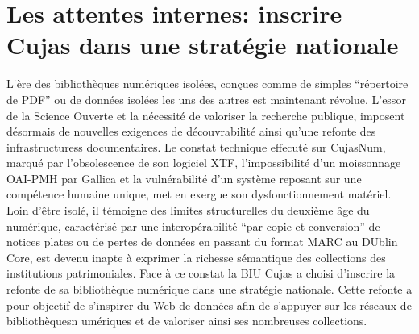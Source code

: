 \chapter[Les attentes internes]{Les attentes internes: inscrire Cujas dans une stratégie nationale}

\lettrine{L}'ère des bibliothèques numériques isolées, conçues comme de simples \enquote{répertoire de PDF} ou de données isolées les uns des autres est maintenant révolue. L'essor de la Science Ouverte et la nécessité de valoriser la recherche publique, imposent désormais de nouvelles exigences de découvrabilité ainsi qu'une refonte des infrastructuress documentaires. Le constat technique effecuté sur CujasNum, marqué par l'obsolescence de son logiciel XTF, l'impossibilité d'un moissonnage OAI-PMH par Gallica et la vulnérabilité d'un système reposant sur une compétence humaine unique, met en exergue son dysfonctionnement matériel. Loin d'être isolé, il témoigne des limites structurelles du deuxième âge du numérique, caractérisé par une interopérabilité \enquote{par copie et conversion} de notices plates ou de pertes de données en passant du format MARC au DUblin Core, est devenu inapte à exprimer la richesse sémantique des collections des institutions patrimoniales. Face à ce constat la BIU Cujas a choisi d'inscrire la refonte de sa bibliothèque numérique dans une stratégie nationale. Cette refonte a pour objectif de s'inspirer du Web de données afin de s'appuyer sur les réseaux de bibliothèquesn umériques et de valoriser ainsi ses nombreuses collections.



